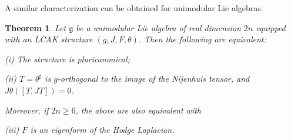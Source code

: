 \documentclass[a4paper,11pt]{amsart}
\newtheorem{thm}{Theorem}
\newtheorem{cor}[thm]{Corollary}
\theoremstyle{definition}
\renewcommand{\[}{\begin{equation*}}
\renewcommand{\]}{\end{equation*}}
\begin{document}
 


\noindent A similar characterization can be obtained for unimodular Lie algebras.  
\begin{thm}\label{lie-algebra-pluricanonical}
Let $\mathfrak{g}$ be a unimodular Lie algebra of real dimension $2n$ equipped with an LCAK structure $(g, J, F, \theta)$. Then the following are equivalent:

(i) The structure is pluricanonical; 

(ii) $T=\theta^\sharp$ is $g$-orthogonal to the image of the Nijenhuis tensor, and $J\theta\left([T,JT]\right) = 0$. 

\noindent Moreover, if $2n \geq 6$, the above are also equivalent with 

(iii) $F$ is an eigenform of the Hodge Laplacian.
\end{thm}
\end{document}
